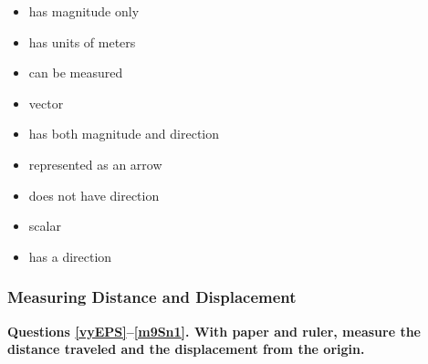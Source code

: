 \documentclass[answers]{exam}
\begin{document}
\begin{questions}
\begin{EnvUplevel}
{\begin{minipage}{5cm}
\begin{itemize}[itemsep=0pt]
    \item has magnitude only
    \item has units of meters
    \item can be measured
    \item vector
    \item has both magnitude and direction
    \item represented as an arrow
    \item does not have direction
    \item scalar
    \item has a direction
\end{itemize}
\end{minipage}
}

\end{EnvUplevel}


\end{questions}

\clearpage





\subsubsection{Measuring Distance and Displacement}   

\textbf{Questions \ref{vyEPS}--\ref{m9Sn1}. With paper and ruler, measure the distance traveled and the displacement from the origin.}      



\clearpage
\end{document}
